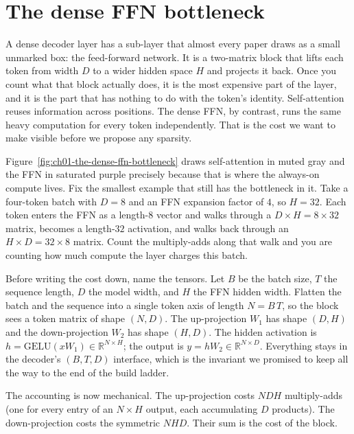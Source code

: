 \section{The dense FFN bottleneck}
\label{sec:ch01-the-dense-ffn-bottleneck}

A dense decoder layer has a sub-layer that almost every paper draws as a small unmarked box: the feed-forward network. It is a two-matrix block that lifts each token from width $D$ to a wider hidden space $H$ and projects it back. Once you count what that block actually does, it is the most expensive part of the layer, and it is the part that has nothing to do with the token's identity. Self-attention reuses information across positions. The dense FFN, by contrast, runs the same heavy computation for every token independently. That is the cost we want to make visible before we propose any sparsity.



Figure~\ref{fig:ch01-the-dense-ffn-bottleneck} draws self-attention in muted gray and the FFN in saturated purple precisely because that is where the always-on compute lives. Fix the smallest example that still has the bottleneck in it. Take a four-token batch with $D = 8$ and an FFN expansion factor of $4$, so $H = 32$. Each token enters the FFN as a length-$8$ vector and walks through a $D{\times}H = 8{\times}32$ matrix, becomes a length-$32$ activation, and walks back through an $H{\times}D = 32{\times}8$ matrix. Count the multiply-adds along that walk and you are counting how much compute the layer charges this batch.

Before writing the cost down, name the tensors. Let $B$ be the batch size, $T$ the sequence length, $D$ the model width, and $H$ the FFN hidden width. Flatten the batch and the sequence into a single token axis of length $N = B\,T$, so the block sees a token matrix of shape $(N, D)$. The up-projection $W_1$ has shape $(D, H)$ and the down-projection $W_2$ has shape $(H, D)$. The hidden activation is $h = \mathrm{GELU}(x W_1) \in \mathbb{R}^{N \times H}$; the output is $y = h W_2 \in \mathbb{R}^{N \times D}$. Everything stays in the decoder's $(B, T, D)$ interface, which is the invariant we promised to keep all the way to the end of the build ladder.



The accounting is now mechanical. The up-projection costs $N D H$ multiply-adds (one for every entry of an $N{\times}H$ output, each accumulating $D$ products). The down-projection costs the symmetric $N H D$. Their sum is the cost of the block.

